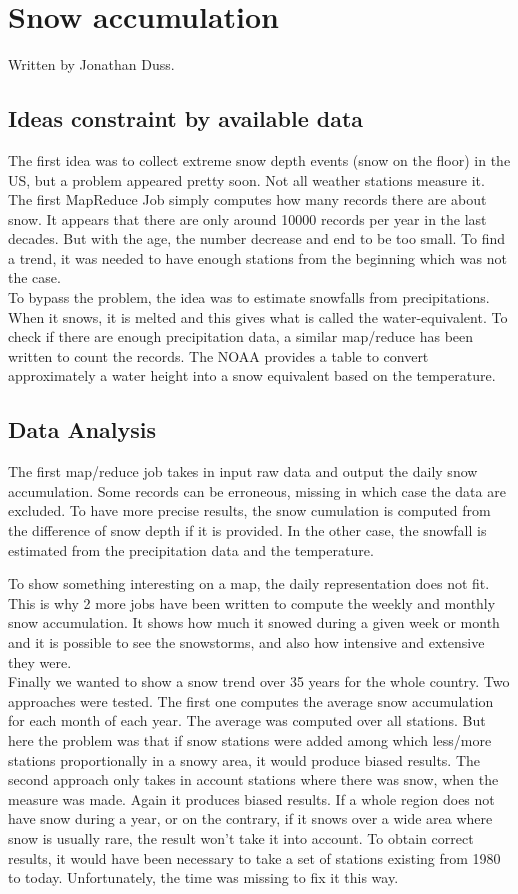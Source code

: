 \section{Snow accumulation}
Written by Jonathan Duss.

\subsection{Ideas constraint by available data}
The first idea was to collect extreme snow depth events (snow on the floor) in the US, but a problem appeared pretty soon. Not all weather stations measure it. The first MapReduce Job simply computes how many records there are about snow. It appears that there are only around 10000 records per year in the last decades. But with the age, the number decrease and end to be too small. To find a trend, it was needed to have enough stations from the beginning which was not the case.  \\

To bypass the problem, the idea was to estimate snowfalls from precipitations. When it snows, it is melted and this gives what is called the water-equivalent. To check if there are enough precipitation data, a similar map/reduce has been written to count the records. The NOAA provides a table to convert approximately a water height into a snow equivalent based on the temperature.

\subsection{Data Analysis}
The first map/reduce job takes in input raw data and output the daily snow accumulation. Some records can be erroneous, missing in which case the data are excluded. To have more precise results, the snow cumulation is computed from the difference of snow depth if it is provided. In the other case, the snowfall is estimated from the precipitation data and the temperature.

To show something interesting on a map, the daily representation does not fit. This is why 2 more jobs have been written to compute the weekly and monthly snow accumulation. It shows how much it snowed during a given week or month and it is possible to see the snowstorms, and also how intensive and extensive they were.\\


Finally we wanted to show a snow trend over 35 years for the whole country. Two approaches were tested. The first one computes the average snow accumulation for each month of each year. The average was computed over all stations. But here the problem was that if snow stations were added among which less/more stations proportionally in a snowy area, it would produce biased results. The second approach only takes in account stations where there was snow, when the measure was made. Again it produces biased results. If a whole region does not have snow during a year, or on the contrary, if it snows over a wide area  where snow is usually rare, the result won't take it into account. To obtain correct results, it would have been necessary to take a set of stations existing from 1980 to today. Unfortunately, the time was missing to fix it this way. 





